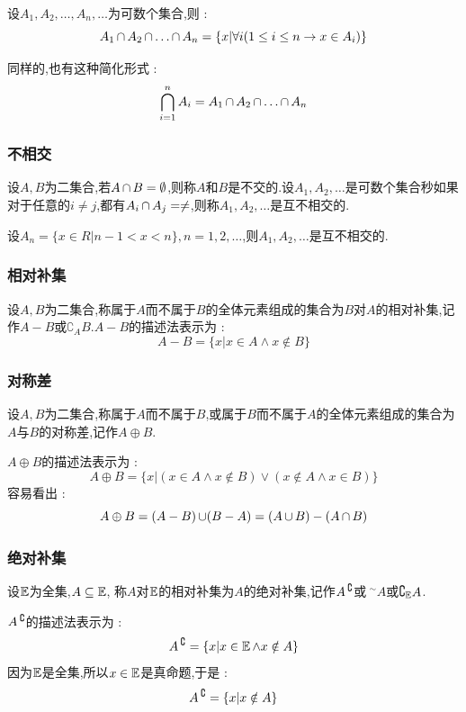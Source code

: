 {{{  设$A_1,A_2,\dots,A_n,\dots$为可数个集合,则 : $$
    A_1 \operatorname{\cap} A_2 \operatorname{\cap} \dots \operatorname{\cap} A_n = \{x | \forall i (1 \leq i \leq n \to x \in A_i)\}
  $$

  同样的,也有这种简化形式 : $$
    \bigcap\limits_{i = 1}^{n}A_i = A_1 \operatorname{\cap} A_2 \operatorname{\cap} \dots \operatorname{\cap} A_n
  $$
}%

\subsubsection{不相交}{
  设$A,B$为二集合,若$A \operatorname{\cap} B = \emptyset$,则称$A$和$B$是不交的.设$A_1,A_2,\dots$是可数个集合秒如果对于任意的$i \neq j$,都有$A_i \operatorname{\cap} A_j = \neq$,则称$A_1,A_2,\dots$是互不相交的.

  设$A_n = \{x \in R | n - 1 < x < n\},n = 1,2,\dots$,则$A_1,A_2,\dots$是互不相交的.
}%

\subsubsection{相对补集}{
  设$A,B$为二集合,称属于$A$而不属于$B$的全体元素组成的集合为$B$对$A$的相对补集,记作$A - B$或$\complement_A B$.$A - B$的描述法表示为 : $$
    A - B = \{x | x \in A \land x \notin B\}
  $$
}%

\subsubsection{对称差}{
  设$A,B$为二集合,称属于$A$而不属于$B$,或属于$B$而不属于$A$的全体元素组成的集合为$A$与$B$的对称差,记作$A \oplus B$.

  $A \oplus B$的描述法表示为 : $$
    A \oplus B = \{x | (x \in A \land x \notin B) \lor (x \notin A \land x \in B)\}
  $$
  容易看出 : $$
    A \oplus B = (A - B) \operatorname{\cup} (B - A) = (A \operatorname{\cup} B) - (A \operatorname{\cap} B)
  $$
}%

\subsubsection{绝对补集}{
  设$\operatorname{\mathbb{E}}$为全集,$A \subseteq \operatorname{\mathbb{E}}$, 称$A$对$\operatorname{\mathbb{E}}$的相对补集为$A$的绝对补集,记作$A\operatorname{^\complement}$或${~}^\sim A$或$\complement_{\operatorname{\mathbb{E}}} A$.

  $A\operatorname{^\complement}$的描述法表示为 : $$
    A\operatorname{^\complement} = \{x | x \in \operatorname{\mathbb{E}} \land x \notin A\}
  $$
  因为$\operatorname{\mathbb{E}}$是全集,所以$x \in \operatorname{\mathbb{E}}$是真命题,于是 : $$
    A\operatorname{^\complement} = \{x | x \notin A\}
  $$
}%

}}
